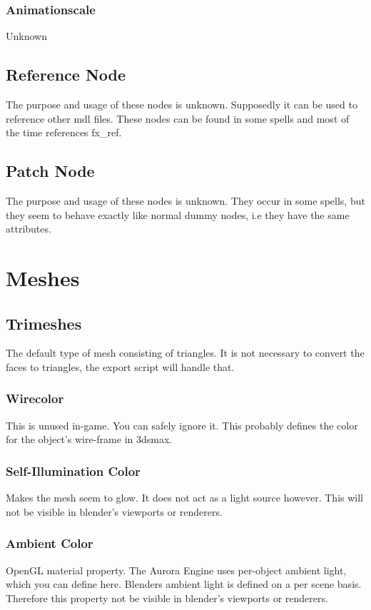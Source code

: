 \subsubsection*{Animationscale}
Unknown

\subsection{Reference Node}
The purpose and usage of these nodes is unknown. Supposedly it can be used to
reference other mdl files. These nodes can be found in some spells and
most of the time references fx\_ref.

\subsection{Patch Node}
The purpose and usage of these nodes is unknown. They occur in some spells, but
they seem to behave exactly like normal dummy nodes, i.e they have the same
attributes.

\section{Meshes}

\subsection{Trimeshes}
The default type of mesh consisting of triangles. It is not necessary to convert 
the faces to triangles, the export script will handle that.

\subsubsection*{Wirecolor}
This is unused in-game. You can safely ignore it. This probably defines the
color for the object's wire-frame in 3dsmax.

\subsubsection*{Self-Illumination Color}
Makes the mesh seem to glow. It does not act as a light source however.
This will not be visible in blender's viewports or renderers.

\subsubsection*{Ambient Color}
OpenGL material property. The Aurora Engine uses per-object ambient light,
which you can define here. Blenders ambient light is defined on a per scene
basis. Therefore this property not be visible in blender's viewports or
renderers.

